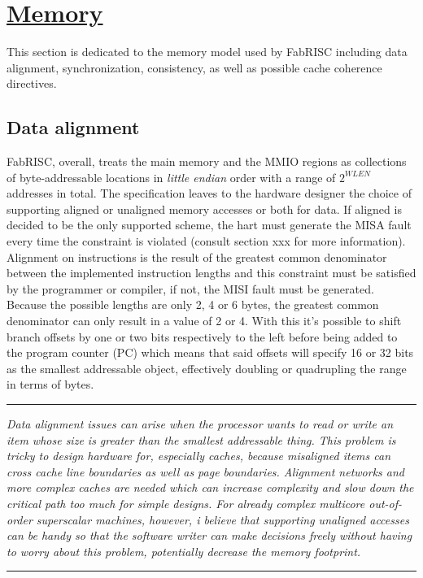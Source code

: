 \section[Memory]{\LARGE\underline{Memory}}

    \vspace{10pt}

    This section is dedicated to the memory model used by FabRISC including data alignment, synchronization, consistency, as well as possible cache coherence directives.

    \subsection[Data alignment]{Data alignment}

        \vspace{10pt}

        FabRISC, overall, treats the main memory and the MMIO regions as collections of byte-addressable locations in \textit{little endian} order with a range of \(2^{WLEN}\) addresses in total. The specification leaves to the hardware designer the choice of supporting aligned or unaligned memory accesses or both for data. If aligned is decided to be the only supported scheme, the hart must generate the MISA fault every time the constraint is violated (consult section xxx for more information). Alignment on instructions is the result of the greatest common denominator between the implemented instruction lengths and this constraint must be satisfied by the programmer or compiler, if not, the MISI fault must be generated. Because the possible lengths are only 2, 4 or 6 bytes, the greatest common denominator can only result in a value of 2 or 4. With this it's possible to shift branch offsets by one or two bits respectively to the left before being added to the program counter (PC) which means that said offsets will specify 16 or 32 bits as the smallest addressable object, effectively doubling or quadrupling the range in terms of bytes.

    \par\noindent\rule{\textwidth}{0.4pt}
    \textit{Data alignment issues can arise when the processor wants to read or write an item whose size is greater than the smallest addressable thing. This problem is tricky to design hardware for, especially caches, because misaligned items can cross cache line boundaries as well as page boundaries. Alignment networks and more complex caches are needed which can increase complexity and slow down the critical path too much for simple designs. For already complex multicore out-of-order superscalar machines, however, i believe that supporting unaligned accesses can be handy so that the software writer can make decisions freely without having to worry about this problem, potentially decrease the memory footprint.}
    \par\noindent\rule{\textwidth}{0.4pt}

